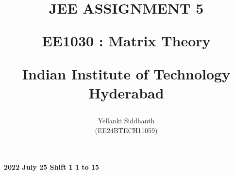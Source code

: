 \documentclass[journal]{IEEEtran}
\begin{document}

\onecolumn
\title{
JEE ASSIGNMENT 5

\large{EE1030 : Matrix Theory}

Indian Institute of Technology Hyderabad
}
\author{Yellanki Siddhanth

(EE24BTECH11059)
}	




\maketitle





\bigskip

\renewcommand{\thefigure}{\theenumi}
\renewcommand{\thetable}{\theenumi}
 
    
        \textbf{2022 July 25 Shift 1 1 to 15}
    
\end{document}
